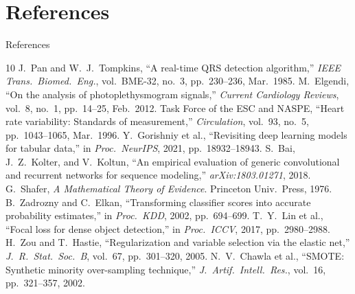 \documentclass[aspectratio=169]{beamer}
\begin{document}
\section*{References}

\begin{frame}[allowframebreaks]{References}
  \begin{thebibliography}{10}
    \small
      J.~Pan and W.~J.~Tompkins,
      ``A real-time QRS detection algorithm,''
      \emph{IEEE Trans.\ Biomed.\ Eng.}, vol.~BME-32, no.~3,
      pp.~230--236, Mar.\ 1985.
      M.~Elgendi,
      ``On the analysis of photoplethysmogram signals,''
      \emph{Current Cardiology Reviews}, vol.~8, no.~1,
      pp.~14--25, Feb.\ 2012.
      Task Force of the ESC and NASPE,
      ``Heart rate variability: Standards of measurement,''
      \emph{Circulation}, vol.~93, no.~5, pp.~1043--1065, Mar.\ 1996.
      Y.~Gorishniy et al.,
      ``Revisiting deep learning models for tabular data,''
      in \emph{Proc.\ NeurIPS}, 2021, pp.~18932--18943.
      S.~Bai, J.~Z.~Kolter, and V.~Koltun,
      ``An empirical evaluation of generic convolutional and recurrent
      networks for sequence modeling,'' \emph{arXiv:1803.01271}, 2018.
      G.~Shafer,
      \emph{A Mathematical Theory of Evidence}.
      Princeton Univ.\ Press, 1976.
      B.~Zadrozny and C.~Elkan,
      ``Transforming classifier scores into accurate probability estimates,''
      in \emph{Proc.\ KDD}, 2002, pp.~694--699.
      T.~Y.~Lin et al.,
      ``Focal loss for dense object detection,''
      in \emph{Proc.\ ICCV}, 2017, pp.~2980--2988.
      H.~Zou and T.~Hastie,
      ``Regularization and variable selection via the elastic net,''
      \emph{J.\ R.\ Stat.\ Soc.\ B}, vol.~67, pp.~301--320, 2005.
      N.~V.~Chawla et al.,
      ``SMOTE: Synthetic minority over-sampling technique,''
      \emph{J.\ Artif.\ Intell.\ Res.}, vol.~16, pp.~321--357, 2002.
  \end{thebibliography}
\end{frame}
\end{document}
